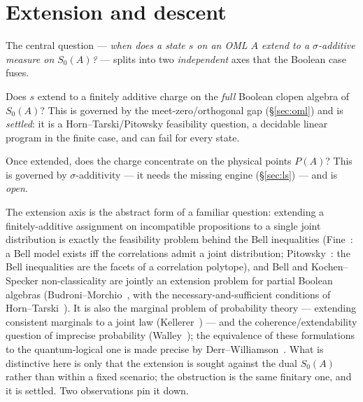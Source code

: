 \documentclass[11pt,reqno]{amsart}
\theoremstyle{plain}
\theoremstyle{definition}
\theoremstyle{remark}
\begin{document}
\section{Extension and descent}
\label{sec:axes}

The central question --- \emph{when does a state $s$ on an OML $A$ extend
to a $\sigma$-additive measure on $S_0(A)$?} --- splits into two
\emph{independent} axes that the Boolean case fuses.
\begin{description}[style=nextline, leftmargin=0pt, itemsep=4pt]
  \item[\normalfont\itshape Extension.] Does $s$ extend to a finitely additive
    charge on the \emph{full} Boolean clopen algebra of $S_0(A)$? This is governed
    by the meet-zero/orthogonal gap (\S\ref{sec:oml}) and is \emph{settled}: it is a
    Horn--Tarski/Pitowsky feasibility question, a decidable linear program in the
    finite case, and can fail for every state.
  \item[\normalfont\itshape Descent.] Once extended, does the charge concentrate on
    the physical points $P(A)$? This is governed by $\sigma$-additivity --- it needs
    the missing engine (\S\ref{sec:ls}) --- and is \emph{open}.
\end{description}

\noindent The extension axis is the abstract form of a familiar question:
extending a finitely-additive assignment on incompatible propositions to a
single joint distribution is exactly the feasibility problem behind the
Bell inequalities (Fine~\cite{Fine1982}: a Bell model exists iff the
correlations admit a joint distribution; Pitowsky~\cite{Pitowsky1989}: the
Bell inequalities are the facets of a correlation polytope), and Bell and
Kochen--Specker non-classicality are jointly an extension problem for partial
Boolean algebras (Budroni--Morchio~\cite{BudroniMorchio2010}, with the
necessary-and-sufficient conditions of Horn--Tarski~\cite{HornTarski1948}).
It is also the marginal problem of probability theory --- extending consistent
marginals to a joint law (Kellerer~\cite{Kellerer1964}) --- and the
coherence/extendability question of imprecise probability
(Walley~\cite{Walley1991}); the equivalence of these formulations to the
quantum-logical one is made precise by Derr--Williamson~\cite{DerrWilliamson2023}.
What is distinctive here is only that the extension is sought against the dual
$S_0(A)$ rather than within a fixed scenario; the obstruction is the same
finitary one, and it is settled. Two observations pin it down.
\end{document}
